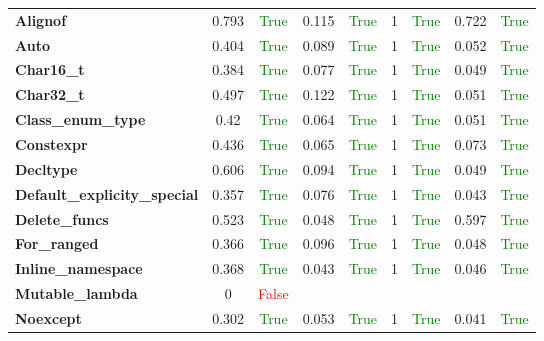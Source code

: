 \documentclass{article}
\begin{document}
\begin{xltabular}{\textwidth}{lcccccccc}
\textbf{{\fontsize{10}{12}\selectfont Alignof}}& 0.793&\textcolor{green}{True}& 0.115&\textcolor{green}{True}& 1&\textcolor{green}{True}& 0.722&\textcolor{green}{True} \\[0.5ex]
\textbf{{\fontsize{10}{12}\selectfont Auto}}& 0.404&\textcolor{green}{True}& 0.089&\textcolor{green}{True}& 1&\textcolor{green}{True}& 0.052&\textcolor{green}{True} \\[0.5ex]
\textbf{{\fontsize{10}{12}\selectfont Char16\_t}}& 0.384&\textcolor{green}{True}& 0.077&\textcolor{green}{True}& 1&\textcolor{green}{True}& 0.049&\textcolor{green}{True} \\[0.5ex]
\textbf{{\fontsize{10}{12}\selectfont Char32\_t}}& 0.497&\textcolor{green}{True}& 0.122&\textcolor{green}{True}& 1&\textcolor{green}{True}& 0.051&\textcolor{green}{True} \\[0.5ex]
\textbf{{\fontsize{10}{12}\selectfont Class\_enum\_type}}& 0.42&\textcolor{green}{True}& 0.064&\textcolor{green}{True}& 1&\textcolor{green}{True}& 0.051&\textcolor{green}{True} \\[0.5ex]
\textbf{{\fontsize{10}{12}\selectfont Constexpr}}& 0.436&\textcolor{green}{True}& 0.065&\textcolor{green}{True}& 1&\textcolor{green}{True}& 0.073&\textcolor{green}{True} \\[0.5ex]
\textbf{{\fontsize{10}{12}\selectfont Decltype}}& 0.606&\textcolor{green}{True}& 0.094&\textcolor{green}{True}& 1&\textcolor{green}{True}& 0.049&\textcolor{green}{True} \\[0.5ex]
\textbf{{\fontsize{10}{12}\selectfont Default\_explicity\_special}}& 0.357&\textcolor{green}{True}& 0.076&\textcolor{green}{True}& 1&\textcolor{green}{True}& 0.043&\textcolor{green}{True} \\[0.5ex]
\textbf{{\fontsize{10}{12}\selectfont Delete\_funcs}}& 0.523&\textcolor{green}{True}& 0.048&\textcolor{green}{True}& 1&\textcolor{green}{True}& 0.597&\textcolor{green}{True} \\[0.5ex]
\textbf{{\fontsize{10}{12}\selectfont For\_ranged}}& 0.366&\textcolor{green}{True}& 0.096&\textcolor{green}{True}& 1&\textcolor{green}{True}& 0.048&\textcolor{green}{True} \\[0.5ex]
\textbf{{\fontsize{10}{12}\selectfont Inline\_namespace}}& 0.368&\textcolor{green}{True}& 0.043&\textcolor{green}{True}& 1&\textcolor{green}{True}& 0.046&\textcolor{green}{True} \\[0.5ex]
\textbf{{\fontsize{10}{12}\selectfont Mutable\_lambda}}& 0&\textcolor{red}{False} \\[0.5ex]
\textbf{{\fontsize{10}{12}\selectfont Noexcept}}& 0.302&\textcolor{green}{True}& 0.053&\textcolor{green}{True}& 1&\textcolor{green}{True}& 0.041&\textcolor{green}{True} \\[0.5ex]

\end{xltabular}
\end{document}
